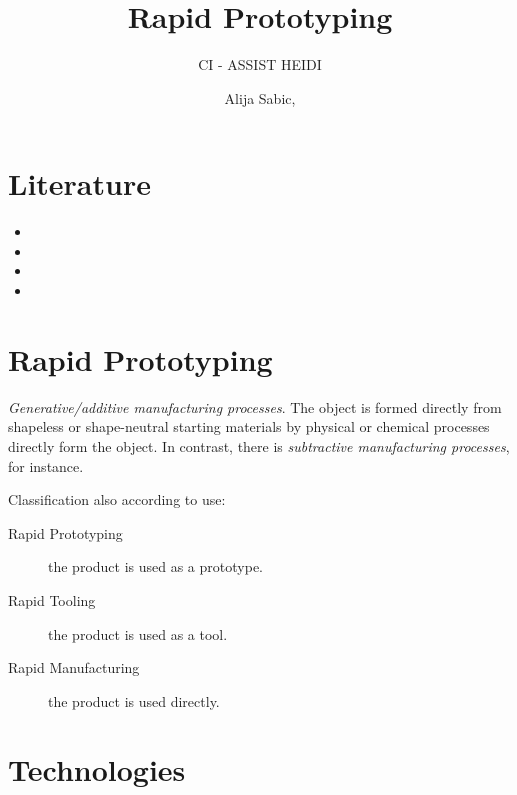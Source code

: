 \documentclass[aspectratio=169]{beamer}
\title[Rapid Prototyping]{Rapid Prototyping}
\subtitle{CI - ASSIST HEIDI}
\author{Alija Sabic, \glsentrytext{msc}}
\institute{Department Electronic Engineering}
\begin{document}
\begin{frame}[plain]
    \titlepage
\end{frame}

\section{Literature}
\begin{frame}
    \begin{itemize}
        \item {}
        \item {}
        \item {}
        \item {}
    \end{itemize}
\end{frame}

\section{Rapid Prototyping}

\begin{frame}
    \par \textit{Generative/additive manufacturing processes}.
    The object is formed directly from shapeless or shape-neutral starting materials by physical or chemical processes directly form the object.
    In contrast, there is \textit{subtractive manufacturing processes}, for instance.
    \par Classification also according to use:
    \begin{description}
        \item[Rapid Prototyping] the product is used as a prototype.
        \item[Rapid Tooling] the product is used as a tool.
        \item[Rapid Manufacturing] the product is used directly.
    \end{description}
\end{frame}

\section{Technologies}

\begin{frame}

\end{frame}
\end{document}
